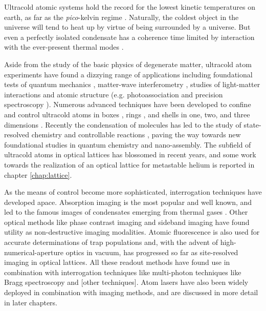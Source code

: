 	Ultracold atomic systems hold the record for the lowest kinetic temperatures on earth, as far as the \emph{pico}-kelvin regime \cite{Kastberg95, Manning14}.
	Naturally, the coldest object in the universe will tend to heat up by virtue of being surrounded by a universe. 
	But even a perfectly isolated condensate has a coherence time limited by interaction with the ever-present thermal modes \cite{Sinatra09}.
	
	Aside from the study of the basic physics of degenerate matter, ultracold atom experiments have found a dizzying range of applications including foundational tests of quantum mechanics \cite{Lopes15,ManningWheeler},	matter-wave interferometry \cite{Cronin09},	studies of light-matter interactions and atomic structure (e.g. photoassociation\cite{Jones06} and precision spectroscopy \cite{CampbellXX,Marti18}). Numerous advanced techniques have been developed to confine and control ultracold atoms in boxes \cite{Papers}, rings \cite{Papers}, and shells \cite{Papers} in one, two, and three dimensions \cite{Papers}. 
	Recently the condensation of molecules \cite{Zwirlein03} has led to the study of state-resolved chemistry and controllable reactions \cite{Papers}, paving the way towards new foundational studies in quantum chemistry and nano-assembly. 
	The subfield of ultracold atoms in optical lattices \cite{BlochReview} has blossomed in recent years, and some work towards the realization of an optical lattice for metastable helium is reported in chapter \ref{chap:lattice}.
	
		

	As the means of control become more sophisticated, interrogation techniques have developed apace. Absorption imaging is the most popular and well known, and led to the famous images of condensates emerging from thermal gases \cite{MakingProbingUnderstanding,Originalpapers,Others}. Other optical methods like phase contrast imaging \cite{Eg} and sideband imaging \cite{Eg} have found utility as non-destructive imaging modalities. Atomic fluorescence is also used for accurate determinations of trap populations \cite{Eg} and, with the advent of high-numerical-aperture optics in vacuum, has progressed so far as site-resolved imaging in optical lattices. 
	All these readout methods have found use in combination with interrogation techniques like multi-photon techniques like Bragg \cite{Some,Early,Works} spectroscopy and [other techniques]. Atom lasers \cite{Papers} have also been widely deployed in combination with imaging methods, and are discussed in more detail in later chapters.
	
